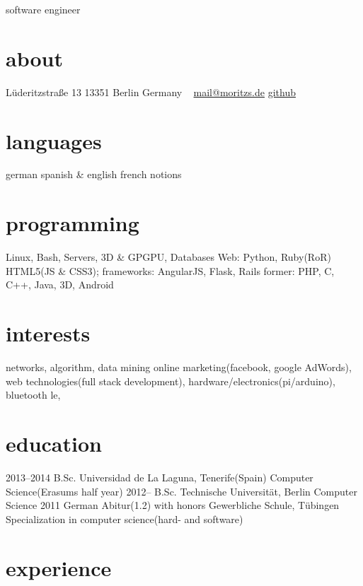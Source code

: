 \documentclass[]{friggeri-cv}
\begin{document}
       {software engineer}


\begin{aside}
  \section{about}
    Lüderitzstraße 13
    13351 Berlin
    Germany
    ~
    \href{mailto:mail@moritz.de}{mail@moritzs.de}
    \href{https://github.com/moritzschaefer}{github}
  \section{languages}
    german
    spanish \&  english
    french notions
  \section{programming}
    Linux, Bash, Servers, 3D \& GPGPU, Databases
    Web:
    Python, Ruby(RoR)
    HTML5(JS \& CSS3); frameworks: AngularJS, Flask, Rails
    former:
    PHP, C, C++, Java, 3D, Android
\end{aside}

\section{interests}

networks, algorithm, data mining
online marketing(facebook, google AdWords),
web technologies(full stack development),
hardware/electronics(pi/arduino), bluetooth le,

\section{education}

\begin{entrylist}
  \entry
    {2013–2014}
    {B.Sc.}
    {Universidad de La Laguna, Tenerife(Spain)}
    {Computer Science(Erasums half year)}
  \entry
    {2012–}
    {B.Sc.}
    {Technische Universität, Berlin}
    {Computer Science}
  \entry
    {2011}
    {German Abitur(1.2) with honors}
    {Gewerbliche Schule, Tübingen}
    {Specialization in computer science(hard- and software)}
\end{entrylist}

\section{experience}
\end{document}
